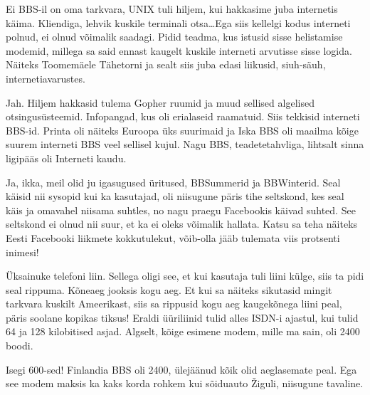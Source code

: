 
Ei BBS-il on oma tarkvara, UNIX tuli hiljem, kui hakkasime juba internetis 
käima. Kliendiga, lehvik kuskile terminali otsa\ldots Ega siis kellelgi kodus 
interneti polnud, ei olnud võimalik saadagi. Pidid teadma, kus istusid  sisse 
helistamise modemid, millega sa said ennast kaugelt kuskile interneti arvutisse 
sisse logida. Näiteks Toomemäele Tähetorni ja sealt siis 
juba edasi liikusid, siuh-säuh, internetiavarustes.
                 
                 
Jah. Hiljem hakkasid tulema Gopher ruumid ja muud sellised algelised 
otsingusüsteemid. Infopangad, kus oli erialaseid raamatuid. Siis tekkisid 
interneti BBS-id. Printa oli näiteks Euroopa üks suurimaid ja 
Iska BBS oli 
maailma kõige suurem interneti BBS veel sellisel kujul. Nagu BBS, 
teadetetahvliga, lihtsalt sinna ligipääs oli Interneti kaudu.


Ja, ikka, meil olid ju igasugused üritused, BBSummerid ja 
BBWinterid. Seal käisid nii sysopid kui ka  kasutajad, oli 
niisugune päris tihe seltskond, kes seal käis ja omavahel niisama suhtles, no 
nagu praegu Facebookis käivad suhted.  See seltskond ei olnud nii suur, et ka  
ei oleks võimalik hallata. Katsu sa teha näiteks Eesti Facebooki liikmete 
kokkutulekut, võib-olla  jääb tulemata  viis protsenti inimesi!
        

Üksainuke telefoni liin. Sellega oligi see, et kui kasutaja tuli  liini külge, 
siis ta pidi seal rippuma. Kõneaeg jooksis kogu aeg. Et kui sa näiteks 
sikutasid mingit tarkvara kuskilt Ameerikast, siis sa rippusid kogu aeg 
kaugekõnega liini peal, päris soolane kopikas tiksus! Eraldi üüriliinid tulid 
alles ISDN-i ajastul, kui tulid 64 ja 128 kilobitised asjad. Algselt, kõige 
esimene modem, mille ma sain, oli 2400 boodi.
                 

Isegi 600-sed! Finlandia  BBS oli 2400,  ülejäänud kõik 
olid aeglasemate peal. Ega see modem maksis ka kaks korda rohkem kui sõiduauto 
Žiguli, niisugune tavaline.

